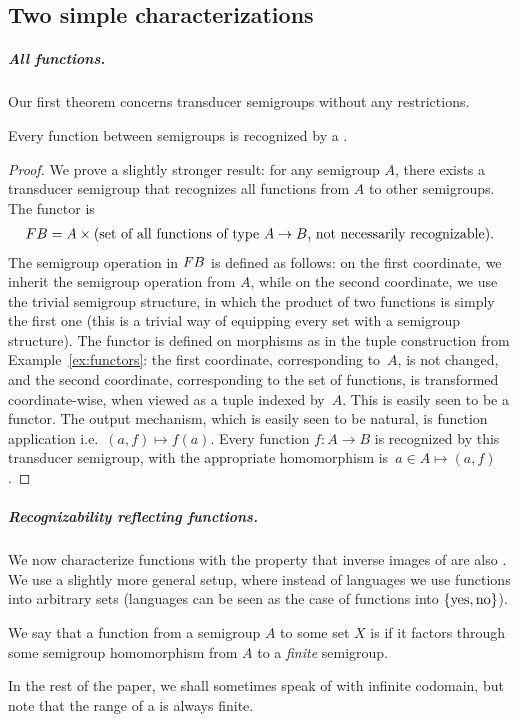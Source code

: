 \subsection{Two simple characterizations}
\label{sec:two-simple}

\subparagraph{All functions.} Our first theorem concerns transducer semigroups without any restrictions.

\begin{theorem}\label{thm:all-functions} 
 Every function between semigroups is recognized by a .
\end{theorem}
\begin{proof}
 We prove a slightly stronger result: for any semigroup $A$, there exists a transducer semigroup that recognizes all functions from $A$ to other semigroups. The functor is 
 \begin{align*}
 \functor B = A \times \text{(set of all functions of type $A \to B$, not necessarily recognizable)}.
 \end{align*}
 \AP The semigroup operation in $\functor B$ is defined as follows: on the first coordinate, we inherit the semigroup operation from $A$, while on the second coordinate, we use the trivial  semigroup structure, in which  the product of two functions is simply the first one (this is a trivial way of equipping every set with a semigroup structure). The functor is defined on morphisms
as in the tuple construction from Example~\ref{ex:functors}: the first coordinate, corresponding to~$A$, is not changed, and the second coordinate, corresponding to the set of functions, is transformed coordinate-wise, when viewed as a tuple indexed by~$A$. This is easily seen to be a functor. The output mechanism, which is easily seen to be natural, is function application i.e.~$(a,f) \mapsto f(a)$.
Every function $f\colon A \to B$ is recognized by this transducer semigroup, with the appropriate homomorphism is~$a \in A \mapsto (a,f)$.
\end{proof}

\subparagraph{Recognizability reflecting functions.} We now characterize
functions with the property that inverse images of  are
also . We use a slightly more general setup, where instead of
languages we use functions into arbitrary sets (languages can be seen as the
case of functions into $\{\text{yes},\text{no}\}$).

\begin{definition}
  We say that a function from a semigroup $A$ to some set $X$ is
   if it factors through some semigroup homomorphism from $A$
  to a \emph{finite} semigroup.
\end{definition}
In the rest of the paper, we shall sometimes
speak of  with infinite codomain, but note that the
range of a  is always finite.

